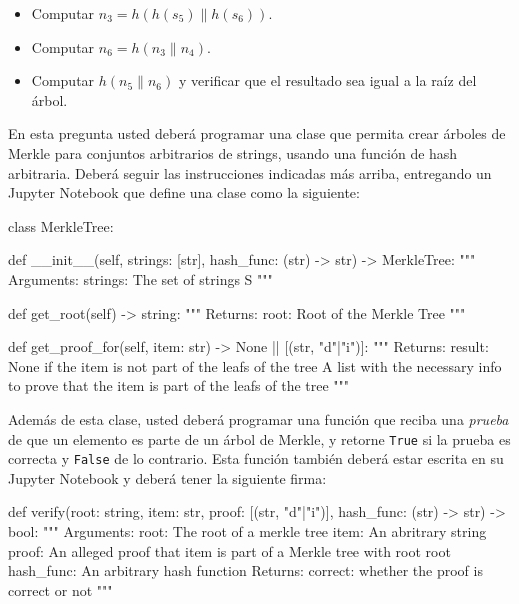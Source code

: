 \begin{itemize}
  \item Computar $n_3=h(h(s_5)\|h(s_6))$.
  \item Computar $n_6=h(n_3\|n_4)$.
  \item Computar $h(n_5\|n_6)$ y verificar que el resultado sea igual a la raíz del árbol.
\end{itemize}

En esta pregunta usted deberá programar una clase que permita crear árboles de Merkle para conjuntos arbitrarios de strings, usando una función de hash arbitraria. Deberá seguir las instrucciones indicadas más arriba, entregando un Jupyter Notebook que define una clase como la siguiente:

\bigskip
\begin{python}
  class MerkleTree:
    
    def __init__(self, strings: [str], hash_func: (str) -> str) -> MerkleTree:
    """
    Arguments:
      strings: The set of strings S
    """

    def get_root(self) -> string:
    """
    Returns:
      root: Root of the Merkle Tree
    """

    def get_proof_for(self, item: str) -> None || [(str, "d"|"i")]:
    """
    Returns:
      result: None if the item is not part of the leafs of the tree
              A list with the necessary info to prove that the
              item is part of the leafs of the tree
    """
\end{python}

Además de esta clase, usted deberá programar una función que reciba una \emph{prueba} de que un elemento es parte de un árbol de Merkle, y retorne \texttt{True} si la prueba es correcta y \texttt{False} de lo contrario. Esta función también deberá estar escrita en su Jupyter Notebook y deberá tener la siguiente firma:

\bigskip
\begin{python}
  def verify(root: string, item: str, proof: [(str, "d"|"i")], hash_func: (str) -> str) -> bool:
    """
    Arguments:
      root: The root of a merkle tree
      item: An abritrary string
      proof: An alleged proof that item is part of a Merkle
             tree with root root
      hash_func: An arbitrary hash function
    Returns:
      correct: whether the proof is correct or not
    """
\end{python}
